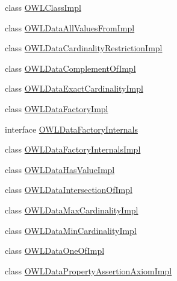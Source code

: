 \begin{DoxyCompactItemize}
\item 
class \hyperlink{classuk_1_1ac_1_1manchester_1_1cs_1_1owl_1_1owlapi_1_1_o_w_l_class_impl}{O\-W\-L\-Class\-Impl}
\item 
class \hyperlink{classuk_1_1ac_1_1manchester_1_1cs_1_1owl_1_1owlapi_1_1_o_w_l_data_all_values_from_impl}{O\-W\-L\-Data\-All\-Values\-From\-Impl}
\item 
class \hyperlink{classuk_1_1ac_1_1manchester_1_1cs_1_1owl_1_1owlapi_1_1_o_w_l_data_cardinality_restriction_impl}{O\-W\-L\-Data\-Cardinality\-Restriction\-Impl}
\item 
class \hyperlink{classuk_1_1ac_1_1manchester_1_1cs_1_1owl_1_1owlapi_1_1_o_w_l_data_complement_of_impl}{O\-W\-L\-Data\-Complement\-Of\-Impl}
\item 
class \hyperlink{classuk_1_1ac_1_1manchester_1_1cs_1_1owl_1_1owlapi_1_1_o_w_l_data_exact_cardinality_impl}{O\-W\-L\-Data\-Exact\-Cardinality\-Impl}
\item 
class \hyperlink{classuk_1_1ac_1_1manchester_1_1cs_1_1owl_1_1owlapi_1_1_o_w_l_data_factory_impl}{O\-W\-L\-Data\-Factory\-Impl}
\item 
interface \hyperlink{interfaceuk_1_1ac_1_1manchester_1_1cs_1_1owl_1_1owlapi_1_1_o_w_l_data_factory_internals}{O\-W\-L\-Data\-Factory\-Internals}
\item 
class \hyperlink{classuk_1_1ac_1_1manchester_1_1cs_1_1owl_1_1owlapi_1_1_o_w_l_data_factory_internals_impl}{O\-W\-L\-Data\-Factory\-Internals\-Impl}
\item 
class \hyperlink{classuk_1_1ac_1_1manchester_1_1cs_1_1owl_1_1owlapi_1_1_o_w_l_data_has_value_impl}{O\-W\-L\-Data\-Has\-Value\-Impl}
\item 
class \hyperlink{classuk_1_1ac_1_1manchester_1_1cs_1_1owl_1_1owlapi_1_1_o_w_l_data_intersection_of_impl}{O\-W\-L\-Data\-Intersection\-Of\-Impl}
\item 
class \hyperlink{classuk_1_1ac_1_1manchester_1_1cs_1_1owl_1_1owlapi_1_1_o_w_l_data_max_cardinality_impl}{O\-W\-L\-Data\-Max\-Cardinality\-Impl}
\item 
class \hyperlink{classuk_1_1ac_1_1manchester_1_1cs_1_1owl_1_1owlapi_1_1_o_w_l_data_min_cardinality_impl}{O\-W\-L\-Data\-Min\-Cardinality\-Impl}
\item 
class \hyperlink{classuk_1_1ac_1_1manchester_1_1cs_1_1owl_1_1owlapi_1_1_o_w_l_data_one_of_impl}{O\-W\-L\-Data\-One\-Of\-Impl}
\item 
class \hyperlink{classuk_1_1ac_1_1manchester_1_1cs_1_1owl_1_1owlapi_1_1_o_w_l_data_property_assertion_axiom_impl}{O\-W\-L\-Data\-Property\-Assertion\-Axiom\-Impl}

\end{DoxyCompactItemize}
